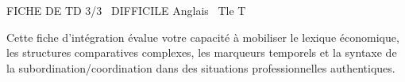 \documentclass[11pt]{article}
\begin{document}
\begin{tcolorbox}[enhanced,colback=popink,colframe=popink,arc=10pt,boxrule=0pt,left=12pt,right=12pt,top=9pt,bottom=9pt]
{\color{white}\popxbold\small FICHE DE TD 3/3 \textbullet\ DIFFICILE \hfill Anglais \textbullet\ Tle T\par}
\end{tcolorbox}
\vspace{4pt}
Cette fiche d'intégration évalue votre capacité à mobiliser le lexique économique, les structures comparatives complexes, les marqueurs temporels et la syntaxe de la subordination/coordination dans des situations professionnelles authentiques.
\end{document}
